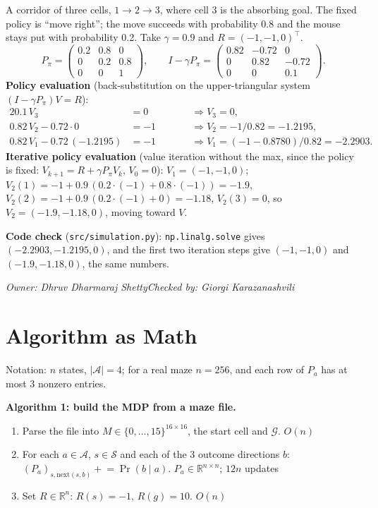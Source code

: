 \documentclass[10pt]{article}
\theoremstyle{definition}
\newcommand{\GK}{Giorgi Karazanashvili}
\newcommand{\DS}{Dhruv Dharmaraj Shetty}
\newcommand{\signoff}[2]{\par\smallskip\hfill\emph{Owner: #1}\qquad\emph{Checked by: #2}\par\medskip}
\newcommand{\R}{\mathbb{R}}
\newcommand{\Sset}{\mathcal{S}}
\newcommand{\Aset}{\mathcal{A}}
\newcommand{\Gset}{\mathcal{G}}
\begin{document}
A corridor of three cells, $1\to2\to3$, where cell 3 is the absorbing goal. The fixed policy is ``move right''; the move succeeds with probability 0.8 and the mouse stays put with probability 0.2. Take $\gamma = 0.9$ and $R = (-1,-1,0)^\top$.
\[
P_\pi = \begin{pmatrix}0.2&0.8&0\\0&0.2&0.8\\0&0&1\end{pmatrix},\qquad
I-\gamma P_\pi = \begin{pmatrix}0.82&-0.72&0\\0&0.82&-0.72\\0&0&0.1\end{pmatrix}.
\]
\textbf{Policy evaluation} (back-substitution on the upper-triangular system $(I-\gamma P_\pi)V = R$):
\begin{alignat*}{2}
0.1\,V_3 &= 0 &\qquad&\Rightarrow V_3 = 0,\\
0.82\,V_2 - 0.72\cdot0 &= -1 &&\Rightarrow V_2 = -1/0.82 = -1.2195,\\
0.82\,V_1 - 0.72\,(-1.2195) &= -1 &&\Rightarrow V_1 = (-1-0.8780)/0.82 = -2.2903.
\end{alignat*}
\textbf{Iterative policy evaluation} (value iteration without the max, since the policy is fixed: $V_{k+1} = R+\gamma P_\pi V_k$, $V_0 = 0$): $V_1 = (-1,-1,0)$; $V_2(1) = -1 + 0.9\,(0.2\cdot(-1) + 0.8\cdot(-1)) = -1.9$, $V_2(2) = -1 + 0.9\,(0.2\cdot(-1) + 0) = -1.18$, $V_2(3) = 0$, so $V_2 = (-1.9,-1.18,0)$, moving toward $V$.

\textbf{Code check} (\texttt{src/simulation.py}): \texttt{np.linalg.solve} gives $(-2.2903,-1.2195,0)$, and the first two iteration steps give $(-1,-1,0)$ and $(-1.9,-1.18,0)$, the same numbers.
\signoff{\DS}{\GK}

\section{Algorithm as Math}

Notation: $n$ states, $|\Aset| = 4$; for a real maze $n = 256$, and each row of $P_a$ has at most 3 nonzero entries.

\medskip
\noindent\textbf{Algorithm 1: build the MDP from a maze file.}
\begin{enumerate}[nosep]
\item Parse the file into $M\in\{0,\dots,15\}^{16\times16}$, the start cell and $\Gset$. \hfill $O(n)$
\item For each $a\in\Aset$, $s\in\Sset$ and each of the 3 outcome directions $b$: $(P_a)_{s,\mathrm{next}(s,b)} \mathrel{+}= \Pr(b\mid a)$. \hfill $P_a\in\R^{n\times n}$; $12n$ updates
\item Set $R\in\R^n$: $R(s) = -1$, $R(g) = 10$. \hfill $O(n)$
\end{enumerate}
\end{document}

